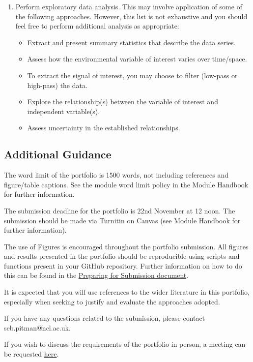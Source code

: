 \documentclass[11pt,onecolumn,a4paper,notitlepage]{article}
\begin{document}
\begin{enumerate}[resume]
\item{Perform exploratory data analysis. This may involve application of some of the following approaches. However, this list is not exhaustive and you should feel free to perform additional analysis as appropriate:} 

\begin{itemize}
\item{Extract and present summary statistics that describe the data series.}
\item{Assess how the environmental variable of interest varies over time/space.}
\item{To extract the signal of interest, you may choose to filter (low-pass or high-pass) the data.}
\item{Explore the relationship(s) between the variable of interest and independent variable(s).}
\item{Assess uncertainty in the established relationships.}
\end{itemize}

\end{enumerate}


\subsection*{Additional Guidance}

\noindent The word limit of the portfolio is 1500 words, not including references and figure/table captions. See the module word limit policy in the Module Handbook for further information.
\bigskip

\noindent 
The submission deadline for the portfolio is 22nd November at 12 noon. The submission should be made via Turnitin on Canvas (see Module Handbook for further information).
\bigskip

\noindent 
The use of Figures is encouraged throughout the portfolio submission. All figures and results presented in the portfolio should be reproducible using scripts and functions present in your GitHub repository. Further information on how to do this can be found in the \href{}{Preparing for Submission document}.
\bigskip

\noindent 
It is expected that you will use references to the wider literature in this portfolio, especially when seeking to justify and evaluate the approaches adopted.
\bigskip

\noindent If you have any questions related to the submission, please contact seb.pitman@ncl.ac.uk.

\bigskip

\noindent 
If you wish to discuss the requirements of the portfolio in person, a meeting can be requested \href{https://rb.gy/19xzw}{here}.
\end{document}
